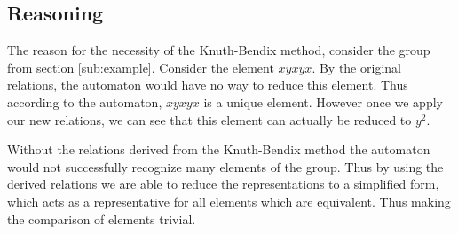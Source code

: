 \documentclass[10pt]{amsart}
\theoremstyle{definition}
\begin{document}
\subsection{Reasoning}%
\label{sub:reasoning}

The reason for the necessity of the Knuth-Bendix method, consider the group
from section \ref{sub:example}. Consider the element $xyxyx$. By the original
relations, the automaton would have no way to reduce this element. Thus
according to the automaton, $xyxyx$ is a unique element. However once we apply
our new relations, we can see that this element can actually be reduced to
$y^2$.

Without the relations derived from the Knuth-Bendix method the automaton would
not successfully recognize many elements of the group. Thus by using the
derived relations we are able to reduce the representations to a simplified
form, which acts as a representative for all elements which are equivalent.
Thus making the comparison of elements trivial.

\nocite{*}


\end{document}
